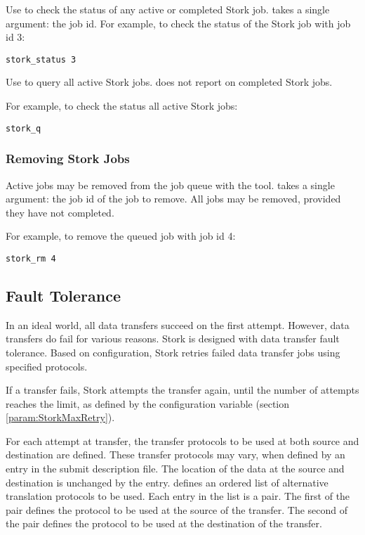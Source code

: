 Use  to check the status of any active
or completed Stork job.
 takes a single argument: the job id.
For example, to check the status of the Stork job with job id 3:

\begin{verbatim}
stork_status 3
\end{verbatim}

Use  to query all active Stork jobs.
 does not report on completed Stork jobs.

For example, to check the status all active Stork jobs:

\begin{verbatim}
stork_q
\end{verbatim}

\subsubsection{\label{sec:stork-rm}Removing Stork Jobs}

Active jobs may be removed from the job queue with the 
 tool.  
 takes a single argument: the job id of the job to remove.
All jobs may
be removed, provided they have not completed.

For example, to remove the queued job with job id 4:

\begin{verbatim}
stork_rm 4
\end{verbatim}

\subsection{\label{sec:Stork-Fault-Protection}Fault Tolerance}

In an ideal world, all data transfers succeed on the first attempt.
However, data transfers do fail for various reasons.
Stork is designed with data transfer fault tolerance.
Based on configuration, Stork retries failed data transfer jobs
using specified protocols.

If a  transfer fails, Stork attempts the transfer again,
until the number of attempts reaches the limit,
as defined by the 
configuration variable
(section \ref{param:StorkMaxRetry}).  

For each attempt at transfer,
the transfer protocols to be used at both source and destination are defined.
These transfer protocols may vary,
when defined by an  entry in the
submit description file.
The location of the data at the source and destination
is unchanged by the  entry.
 defines an ordered list of alternative
translation protocols to be used.
Each entry in the list is a pair.
The first of the pair defines the protocol to be used at the source 
of the transfer.
The second of the pair defines the protocol to be used at the destination 
of the transfer.


